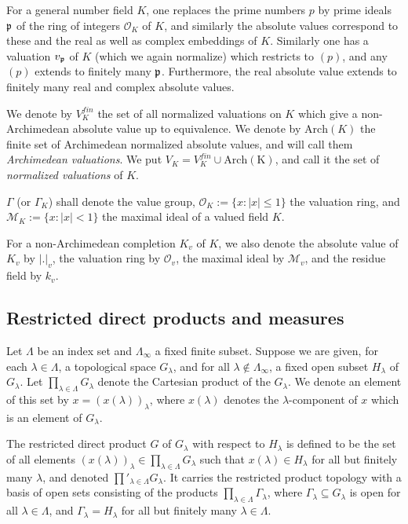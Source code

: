 \documentclass[12pt]{amsart}
\def\cM{\mathcal M}
\def\cO{\mathcal{O}}
\numberwithin{equation}{section}
\begin{document}
For a general number field $K$, one replaces the prime numbers $p$ by prime ideals $\frak{p}$ of the ring of integers $\cO_K$ of $K$, and similarly the absolute values correspond to these and the real as well as complex embeddings of $K$. Similarly one has a valuation $v_{\frak{p}}$ of $K$ (which we again normalize) which restricts to $(p)$, and any $(p)$ extends to finitely many $\frak{p}$. Furthermore, the real absolute value extends to finitely many real and complex absolute values.

We denote by $V_K^{fin}$ the set of all normalized valuations on $K$ which give a non-Archimedean absolute value 
up to equivalence. We denote by $\mathrm{Arch}(K)$ the finite set of Archimedean normalized absolute values, and will call them {\it Archimedean valuations}. We put  
$V_K=V_K^{fin} \cup \mathrm{Arch(K)}$, and call it the set of {\it normalized valuations} of $K$.

$\Gamma$ (or $\Gamma_K$) shall denote the value group, $\cO_K:=\{x: |x|\leq 1\}$  
the valuation ring, and $\cM_K:=\{x: |x|< 1\}$ the maximal ideal of a valued field $K$.

For a non-Archimedean completion $K_v$ of $K$, we also denote 
the absolute value of $K_v$ by $|.|_v$, the valuation ring by $\mathcal{O}_v$, the maximal ideal by $\cM_v$, and 
the residue field by $k_v$.

\subsection{\bf Restricted direct products and measures}\label{ssec-rest-prod}
Let $\Lambda$ be an index set and $\Lambda_{\infty}$ a fixed finite 
subset. Suppose we are given, for each $\lambda\in \Lambda$, a topological space  
$G_{\lambda}$, and for all $\lambda\notin \Lambda_{\infty}$, 
a fixed open subset $H_{\lambda}$ of $G_{\lambda}$. 
Let $\prod_{\lambda \in \Lambda} G_{\lambda}$ denote the Cartesian product of the $G_{\lambda}$. We denote an element of this set by $x=(x(\lambda))_{\lambda}$, where 
$x(\lambda)$ denotes the $\lambda$-component of $x$ which is an element of $G_{\lambda}$.

The 
restricted direct product $G$ of $G_{\lambda}$ with respect to $H_{\lambda}$ is defined to be the set of all elements 
$(x(\lambda))_{\lambda}\in \prod_{\lambda \in \Lambda} G_{\lambda}$ such that $x(\lambda)\in H_{\lambda}$ for 
all but finitely many $\lambda$, and denoted $\prod'_{\lambda\in \Lambda} G_{\lambda}$. 
It carries the restricted product topology with a basis of open sets consisting of the products $\prod_{\lambda \in \Lambda} \Gamma_{\lambda}$,
where $\Gamma_{\lambda}\subseteq G_{\lambda}$ is open for all $\lambda\in \Lambda$, and 
$\Gamma_{\lambda}=H_{\lambda}$ for all but finitely many $\lambda\in \Lambda$.
\end{document}
